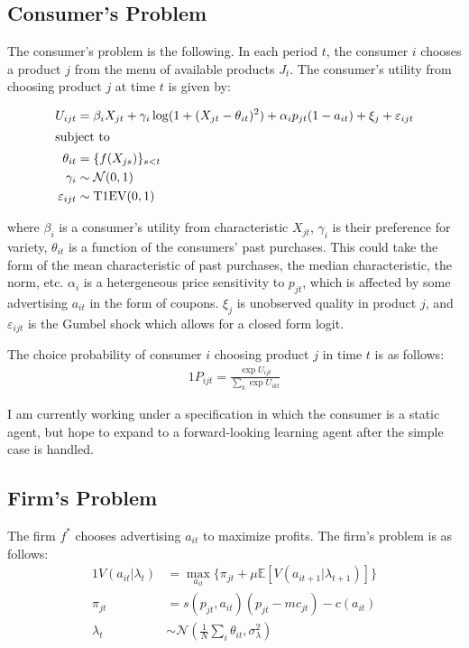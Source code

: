 \documentclass[12pt]{article}
\begin{document}
    \subsection{Consumer's Problem}
    The consumer's problem is the following. In each period $t$, the consumer $i$ chooses a product $j$ from the menu of available products $J_t$. The consumer's utility from choosing product $j$ at time $t$ is given by:

    \begin{alignat*}{1}
        U_{ijt} &= \beta_i X_{jt} + \gamma_i \log(1 + (X_{jt} - \theta_{it})^2) 
                  + \alpha_i p_{jt}(1 - a_{it}) + \xi_j + \varepsilon_{ijt} \\
    \shortintertext{subject to}
        \theta_{it} &= \{f(X_{js})\}_{s < t} \\
        \gamma_i &\sim \mathcal{N}(0, 1)\\ \varepsilon_{ijt} &\sim \text{T1EV}(0,1)
    \end{alignat*}

    where $\beta_i$ is a consumer's utility from characteristic $X_{jt}$, $\gamma_i$ is their preference for variety, $\theta_{it}$ is a function of the consumers' past purchases. This could take the form of the mean characteristic of past purchases, the median characteristic, the norm, etc. $\alpha_i$ is a hetergeneous price sensitivity to $p_{jt}$, which is affected by some advertising $a_{it}$ in the form of coupons. $\xi_j$ is unobserved quality in product $j$, and $\varepsilon_{ijt}$ is the Gumbel shock which allows for a closed form logit.

    The choice probability of consumer $i$ choosing product $j$ in time $t$ is as follows:
    \begin{alignat*}{1}
      P_{ijt} = \frac{\exp{U_{ijt}}}{\sum_k\exp{U_{ikt}}}
    \end{alignat*}

    I am currently working under a specification in which the consumer is a static agent, but hope to expand to a forward-looking learning agent after the simple case is handled.

    \subsection{Firm's Problem}

    The firm $f^*$ chooses advertising $a_{it}$ to maximize profits. The firm's problem is as follows:
    \begin{alignat*}{1}
      V(a_{it} | \lambda_t) &= \max_{a_{it}} \{\pi_{jt} + \mu \mathbb{E}[V(a_{it+1} | \lambda_{t+1})]\} \\
      \pi_{jt} &= s(p_{jt}, a_{it})(p_{jt} - mc_{jt}) - c(a_{it}) \\
      \lambda_t &\sim \mathcal{N}(\frac{1}{N}\sum_i \theta_{it}, \sigma^2_\lambda)
    \end{alignat*}
\end{document}
